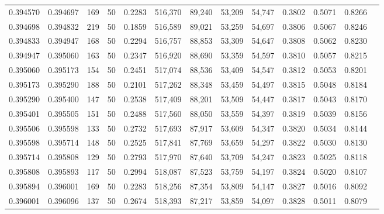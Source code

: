 \begin{tabular}{rrrrrrrrrrrrr}
0.394570 & 0.394697 &   169 &  50 &                                     0.2283 & 516,370 &  89,240 &  53,209 &  54,747 & 0.3802 & 0.5071 & 0.8266 \\
0.394698 & 0.394832 &   219 &  50 &                                     0.1859 & 516,589 &  89,021 &  53,259 &  54,697 & 0.3806 & 0.5067 & 0.8246 \\
0.394833 & 0.394947 &   168 &  50 &                                     0.2294 & 516,757 &  88,853 &  53,309 &  54,647 & 0.3808 & 0.5062 & 0.8230 \\
0.394947 & 0.395060 &   163 &  50 &                                     0.2347 & 516,920 &  88,690 &  53,359 &  54,597 & 0.3810 & 0.5057 & 0.8215 \\
0.395060 & 0.395173 &   154 &  50 &                                     0.2451 & 517,074 &  88,536 &  53,409 &  54,547 & 0.3812 & 0.5053 & 0.8201 \\
0.395173 & 0.395290 &   188 &  50 &                                     0.2101 & 517,262 &  88,348 &  53,459 &  54,497 & 0.3815 & 0.5048 & 0.8184 \\
0.395290 & 0.395400 &   147 &  50 &                                     0.2538 & 517,409 &  88,201 &  53,509 &  54,447 & 0.3817 & 0.5043 & 0.8170 \\
0.395401 & 0.395505 &   151 &  50 &                                     0.2488 & 517,560 &  88,050 &  53,559 &  54,397 & 0.3819 & 0.5039 & 0.8156 \\
0.395506 & 0.395598 &   133 &  50 &                                     0.2732 & 517,693 &  87,917 &  53,609 &  54,347 & 0.3820 & 0.5034 & 0.8144 \\
0.395598 & 0.395714 &   148 &  50 &                                     0.2525 & 517,841 &  87,769 &  53,659 &  54,297 & 0.3822 & 0.5030 & 0.8130 \\
0.395714 & 0.395808 &   129 &  50 &                                     0.2793 & 517,970 &  87,640 &  53,709 &  54,247 & 0.3823 & 0.5025 & 0.8118 \\
0.395808 & 0.395893 &   117 &  50 &                                     0.2994 & 518,087 &  87,523 &  53,759 &  54,197 & 0.3824 & 0.5020 & 0.8107 \\
0.395894 & 0.396001 &   169 &  50 &                                     0.2283 & 518,256 &  87,354 &  53,809 &  54,147 & 0.3827 & 0.5016 & 0.8092 \\
0.396001 & 0.396096 &   137 &  50 &                                     0.2674 & 518,393 &  87,217 &  53,859 &  54,097 & 0.3828 & 0.5011 & 0.8079 \\

\end{tabular}
